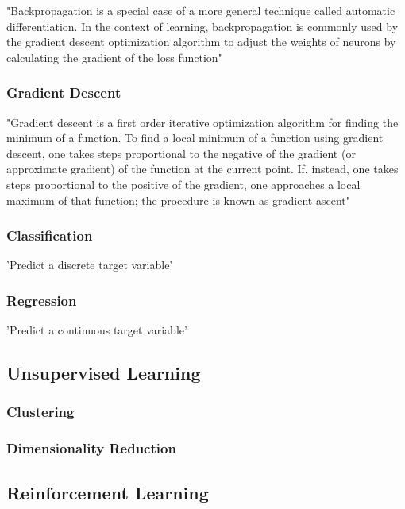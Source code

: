 "Backpropagation is a special case of a more general technique called automatic differentiation. In the context of learning, backpropagation is commonly used by the gradient descent optimization algorithm to adjust the weights of neurons by calculating the gradient of the loss function"

\subsubsection{Gradient Descent}


"Gradient descent is a first order iterative optimization algorithm for finding the minimum of a function. To find a local minimum of a function using gradient descent, one takes steps proportional to the negative of the gradient (or approximate gradient) of the function at the current point. If, instead, one takes steps proportional to the positive of the gradient, one approaches a local maximum of that function; the procedure is known as gradient ascent"




\subsubsection{Classification}
'Predict a discrete target variable'

\subsubsection{Regression}
'Predict a continuous target variable'

\subsection{Unsupervised Learning}

\subsubsection{Clustering}

\subsubsection{Dimensionality Reduction}

\subsection{Reinforcement Learning}

